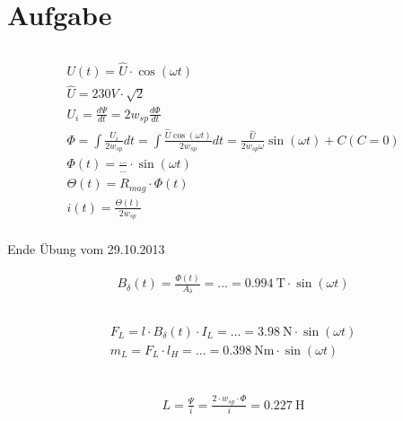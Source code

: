 \documentclass[10pt,a4paper]{article}
\begin{document}
\section{Aufgabe}
\subsection{}
\begin{align*}
U(t) = \hat{U} \cdot \cos (\omega t) \\
\hat{U} = 230 V \cdot \sqrt{2}\\
U_i = \frac{d \Psi}{dt} = 2 w_{sp} \frac{d \Phi}{dt} \\
\Phi = \int \frac{U_i}{2 w_{sp}} dt = \int \frac{\hat{U} \cos (\omega t)}{2w_{sp}} dt = \frac{\hat{U}}{2w_{sp} \omega} \sin (\omega t) + C (C=0) \\
\Phi (t) = \frac{\ldots}{\ldots} \cdot \sin (\omega t) \\
\Theta(t) = R_{mag} \cdot\Phi(t)\\
i(t) = \frac{\Theta(t)}{2w_{sp}}\\
\end{align*}

Ende Übung vom 29.10.2013

\begin{align*}
B_\delta(t) = \frac{\Phi(t)}{A_\delta} = \ldots = \SI{0,994}{\tesla} \cdot \sin(\omega t)
\end{align*}

\subsection{}
\begin{align*}
F_L = l \cdot B_\delta(t) \cdot I_L = \ldots = \SI{3,98}{\newton} \cdot \sin(\omega t) \\
m_L = F_L \cdot l_H = \ldots = \SI{0.398}{\newton\meter} \cdot \sin(\omega t)\\
\end{align*}

\subsection{}
\begin{align*}
L= \frac{\Psi}{i} = \frac{2\cdot w_{sp}\cdot \Phi}{i} = \SI{0.227}{\henry}
\end{align*}
\end{document}
